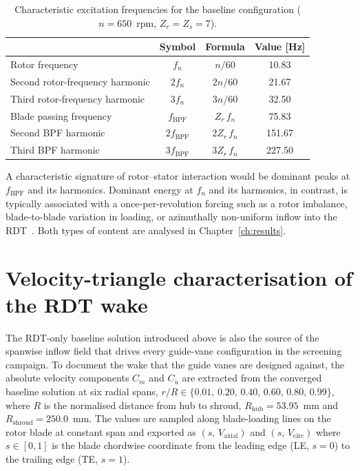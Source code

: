 \begin{table}[H]
\centering
\caption{Characteristic excitation frequencies for the baseline
configuration ($n = 650$~rpm, $Z_r = Z_s = 7$).}
\label{tab:characteristic_freqs}
\begin{tabular}{lccc}
\hline
 & Symbol & Formula & Value [Hz] \\ \hline
Rotor frequency           & $f_n$               & $n/60$         & 10.83  \\
Second rotor-frequency harmonic     & $2f_n$              & $2n/60$        & 21.67  \\
Third rotor-frequency harmonic      & $3f_n$              & $3n/60$        & 32.50  \\
Blade passing frequency   & $f_{\mathrm{BPF}}$  & $Z_r\,f_n$     & 75.83  \\
Second BPF harmonic       & $2f_{\mathrm{BPF}}$ & $2Z_r\,f_n$    & 151.67 \\
Third BPF harmonic        & $3f_{\mathrm{BPF}}$ & $3Z_r\,f_n$    & 227.50 \\ \hline
\end{tabular}
\end{table}
 
A characteristic signature of rotor--stator interaction would be
dominant peaks at $f_{\mathrm{BPF}}$ and its harmonics. Dominant
energy at $f_n$ and its harmonics, in contrast, is typically
associated with a once-per-revolution forcing such as a rotor
imbalance, blade-to-blade variation in loading, or azimuthally
non-uniform inflow into the RDT~\cite{Brekke2015,Bergan2018}. Both
types of content are analysed in Chapter~\ref{ch:results}.


\section{Velocity-triangle characterisation of the RDT wake}
\label{sec:methods_rdt_velocity_triangles}
 
The RDT-only baseline solution introduced above is also the source of
the spanwise inflow field that drives every guide-vane configuration in
the screening campaign. To document the wake that the guide vanes are
designed against, the absolute velocity components $C_m$ and $C_u$ are
extracted from the converged baseline solution at six radial spans,
$r/R \in \{0.01,\,0.20,\,0.40,\,0.60,\,0.80,\,0.99\}$, where $R$ is the
normalised distance from hub to shroud, $R_{\mathrm{hub}}=53.95$~mm and
$R_{\mathrm{shroud}}=250.0$~mm. The values are sampled along
blade-loading lines on the rotor blade at constant span and exported as
$(s,\,V_{\mathrm{axial}})$ and $(s,\,V_{\mathrm{circ}})$ where
$s\in[0,1]$ is the blade chordwise coordinate from the leading edge
(LE, $s=0$) to the trailing edge (TE, $s=1$).
 
